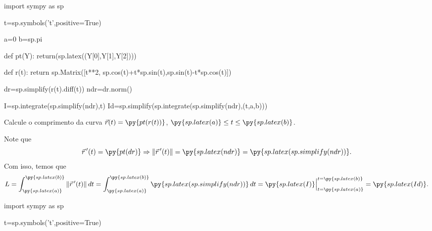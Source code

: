 \documentclass[a4paper,addpoints,12pt]{exam}
\newcommand{\pyl}[1]{\py{sp.latex(#1)}}
\begin{document}
\begin{questions}
\begin{solution}
\begin{parts}
\part 
\[\vec{r}(t)=\py{pt2(rb)},\, t\in[0,2\pi].\]

\part 
\[\vec{r}(x)=\py{pt2(rc)},\ x\in [0,+\infty[ .\]
\end{parts}
\end{solution}


\newpage


\begin{pycode}
import sympy as sp

t=sp.symbols('t',positive=True)

a=0
b=sp.pi

def pt(Y):
 return(sp.latex((Y[0],Y[1],Y[2])))
 
def r(t):
	return sp.Matrix([t**2, sp.cos(t)+t*sp.sin(t),sp.sin(t)-t*sp.cos(t)])

dr=sp.simplify(r(t).diff(t))
ndr=dr.norm()

I=sp.integrate(sp.simplify(ndr),t)
Id=sp.simplify(sp.integrate(sp.simplify(ndr),(t,a,b)))




\end{pycode}

\question[2] Calcule o comprimento da curva $\vec{r}(t)=\py{pt(r(t))}$, $\pyl{a}\leq t\leq \pyl{b}$.



\begin{solution} 
 Note que 
\[\vec{r}\,^\prime(t)=\py{pt(dr)}\Rightarrow \|\vec{r}\,^\prime(t)\|=\pyl{ndr}=\pyl{sp.simplify(ndr)}.\]
Com isso, temos que
\[L=\int_{\pyl{a}}^{\pyl{b}} \|\vec{r}\,^\prime(t)\|\,dt= \int_{\pyl{a}}^{\pyl{b}}\pyl{sp.simplify(ndr)}\,dt=\pyl{I}\Big\vert_{t=\pyl{a}}^{t=\pyl{b}} =\pyl{Id}.\]


\end{solution}


\newpage
\begin{pycode}
import sympy as sp

t=sp.symbols('t',positive=True)



\end{pycode}
\end{questions}
\end{document}
